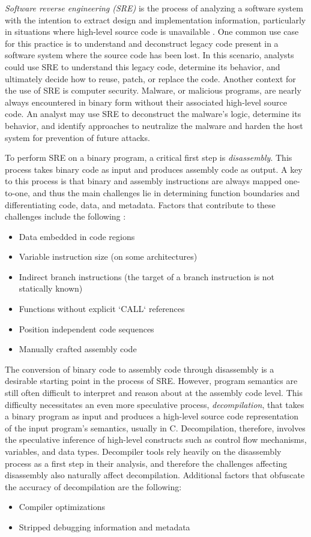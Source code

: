 \emph{Software reverse engineering (SRE)} is the process of analyzing a software system with the intention to extract design and implementation information, particularly in situations where high-level source code is unavailable \cite{bib:sre}. One common use case for this practice is to understand and deconstruct legacy code present in a software system where the source code has been lost. In this scenario, analysts could use SRE to understand this legacy code, determine its behavior, and ultimately decide how to reuse, patch, or replace the code. Another context for the use of SRE is computer security. Malware, or malicious programs, are nearly always encountered in binary form without their associated high-level source code. An analyst may use SRE to deconstruct the malware's logic, determine its behavior, and identify approaches to neutralize the malware and harden the host system for prevention of future attacks.

To perform SRE on a binary program, a critical first step is \emph{disassembly}. This process takes binary code as input and produces assembly code as output. A key to this process is that binary and assembly instructions are always mapped one-to-one, and thus the main challenges lie in determining function boundaries and differentiating code, data, and metadata. Factors that contribute to these challenges include the following \cite{bib:disassembly-challenges}:
\begin{itemize}
    \item Data embedded in code regions
    \item Variable instruction size (on some architectures)
    \item Indirect branch instructions (the target of a branch instruction is not statically known)
    \item Functions without explicit `CALL` references
    \item Position independent code sequences
    \item Manually crafted assembly code
\end{itemize}

The conversion of binary code to assembly code through disassembly is a desirable starting point in the process of SRE. However, program semantics are still often difficult to interpret and reason about at the assembly code level. This difficulty necessitates an even more speculative process, \emph{decompilation}, that takes a binary program as input and produces a high-level source code representation of the input program's semantics, usually in C. Decompilation, therefore, involves the speculative inference of high-level constructs such as control flow mechanisms, variables, and data types. Decompiler tools rely heavily on the disassembly process as a first step in their analysis, and therefore the challenges affecting disassembly also naturally affect decompilation. Additional factors that obfuscate the accuracy of decompilation are the following:
\begin{itemize}
    \item Compiler optimizations
    \item Stripped debugging information and metadata
\end{itemize}


